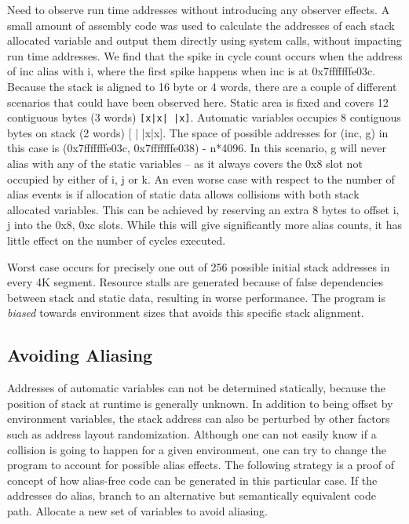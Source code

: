\documentclass[a4paper,10pt,twocolumn,twoside]{article}
\begin{document}
Need to observe run time addresses without introducing any observer effects.
A small amount of assembly code was used to calculate the addresses of each stack allocated variable and output them directly using system calls, without impacting run time addresses.
We find that the spike in cycle count occurs when the address of inc alias with i, where the first spike happens when inc is at 0x7fffffffe03c.
Because the stack is aligned to 16 byte or 4 words, there are a couple of different scenarios that could have been observed here.
Static area is fixed and covers 12 contiguous bytes (3 words) \lstinline$[x|x| |x]$.
Automatic variables occupies 8 contiguous bytes on stack (2 words) [ | |x|x]. 
The space of possible addresses for (inc, g) in this case is (0x7fffffffe03c, 0x7fffffffe038) - n*4096. 
In this scenario, g will never alias with any of the static variables -- as it always covers the 0x8 slot not occupied by either of i, j or k.
An even worse case with respect to the number of alias events is if allocation of static data allows collisions with both stack allocated variables.
This can be achieved by reserving an extra 8 bytes to offset i, j into the 0x8, 0xc slots. 
While this will give significantly more alias counts, it has little effect on the number of cycles executed.

Worst case occurs for precisely one out of 256 possible initial stack addresses in every 4K segment.
Resource stalls are generated because of false dependencies between stack and static data, resulting in worse performance.
The program is \emph{biased} towards environment sizes that avoids this specific stack alignment.


\subsection{Avoiding Aliasing}
Addresses of automatic variables can not be determined statically, because the position of stack at runtime is generally unknown. 
In addition to being offset by environment variables, the stack address can also be perturbed by other factors such as address layout randomization. 
Although one can not easily know if a collision is going to happen for a given environment, one can try to change the program to account for possible alias effects.
The following strategy is a proof of concept of how alias-free code can be generated in this particular case.
If the addresses do alias, branch to an alternative but semantically equivalent code path.
Allocate a new set of variables to avoid aliasing.
\end{document}
